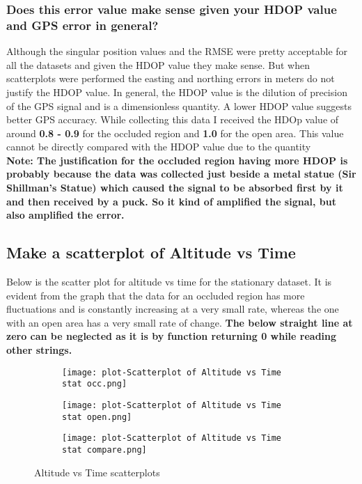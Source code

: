 \documentclass[a4paper]{article}
\begin{document}
\subsubsection{Does this error value make sense given your HDOP value and GPS error in general?}
Although the singular position values and the RMSE were pretty acceptable for all the datasets and given the HDOP value they make sense. But when scatterplots were performed the easting and northing errors in meters do not justify the HDOP value.
In general, the HDOP value is the dilution of precision of the GPS signal and  is a dimensionless quantity. A lower HDOP value suggests better GPS accuracy. While collecting this data I received the HDOp value of around \textbf{0.8 - 0.9} for the occluded region and \textbf{1.0} for the open area. This value cannot be directly compared with the HDOP value due to the quantity\\
\textbf{Note: The justification for the occluded region having more HDOP is probably because the data was collected just beside a metal statue (Sir Shillman's Statue) which caused the signal to be absorbed first by it and then received by a puck. So it kind of amplified the signal, but also amplified the error.}
\subsection{Make a scatterplot of Altitude vs Time}
Below is the scatter plot for altitude vs time for the stationary dataset. It is evident from the graph that the data for an occluded region has more fluctuations and is constantly increasing at a very small rate, whereas the one with an open area has a very small rate of change. \textbf{The below straight line at zero can be neglected as it is by function returning 0 while reading other strings.}
\begin{figure}[H]
\begin{subfigure}{}
     \texttt{[image: plot-Scatterplot of Altitude vs Time stat occ.png]}
\end{subfigure}
\begin{subfigure}{}
    \texttt{[image: plot-Scatterplot of Altitude vs Time stat open.png]}
\end{subfigure}
\begin{subfigure}{}
    \texttt{[image: plot-Scatterplot of Altitude vs Time stat compare.png]}
\end{subfigure}
\caption{Altitude vs Time scatterplots}
\end{figure}
\end{document}
